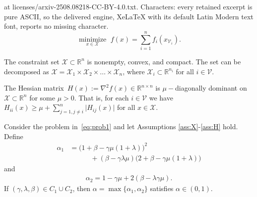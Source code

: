 \documentclass[10pt,a4paper]{amsart}
\newcommand{\R}{\ensuremath{\mathbb{R}}\xspace}
\newcommand{\V}{\ensuremath{\mathcal{V}}\xspace}
\newcommand{\X}{\ensuremath{\mathcal{X}}\xspace}
\begin{document}
at licenses/arxiv-2508.08218-CC-BY-4.0.txt. Characters: every retained excerpt is pure ASCII, so the delivered engine, XeLaTeX with its default Latin Modern text font, reports no missing character.
    \begin{equation} \label{eq:prob1}
        \underset{x \in \X}{\operatorname{minimize}} \,\, f(x) = \sum_{i=1}^nf_i(x_{\V_i}). 
    \end{equation}    

\begin{assumption}\label{ass:X}
    The constraint set $\X\subset \R^n$ is nonempty, convex, and compact. The set can be decomposed as $\X=\X_1 \times \X_2 \times \dots \times \X_n$, where $\X_i\subset \R^{n_i}$ for all $i\in \V$.
\end{assumption}

\begin{assumption} \label{ass:H}
    The Hessian matrix~$H(x):=\nabla^2f(x)\in \R^{n\times n}$ is $\mu-$diagonally dominant on $\X\subset \R^n$ for some $\mu>0$. 
    That is, for each $i\in \V$ we have $H_{ii}(x)\geq \mu + \sum_{j=1,j\not=i}^n\vert H_{ij}(x) \vert$ for all $x\in \X$.
\end{assumption}

    \begin{lemma}\label{lem:alphabound}
        Consider the problem in~\eqref{eq:prob1} and let Assumptions \ref{ass:X}-\ref{ass:H} hold.
        Define
        \begin{align}\label{eq:alpha1}
        \alpha_1&= \big(1+\beta-\gamma\mu(1+\lambda)\big)^2 
        \\ &\quad\quad\quad + (\beta-\gamma\lambda \mu)\big(2+\beta-\gamma\mu(1+\lambda)\big)
    \end{align}
    and
    \begin{align}\label{eq:alpha2}
        \alpha_2 = 1-\gamma\mu+2(\beta-\lambda\gamma\mu).
    \end{align}
        If $(\gamma,\lambda,\beta)\in C_1\cup C_2$, then $\alpha=\max\{\alpha_1,\alpha_2\}$ 
        satisfies $\alpha\in(0,1)$.
    \end{lemma}
\end{document}

